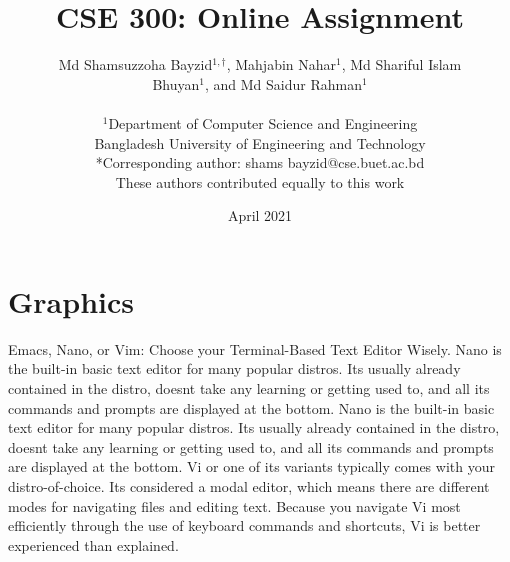 \documentclass[12pt, a4paper]{article} %
\title{CSE 300: Online Assignment}
\author{Md Shamsuzzoha Bayzid$^{1,\dagger}$, Mahjabin Nahar$^{1}$, Md Shariful Islam\\ Bhuyan$^{1}$, and Md Saidur Rahman$^{1}$ \\ \\
	$^1$Department of Computer Science and Engineering \\
	Bangladesh University of Engineering and Technology \\
	*Corresponding author: shams bayzid@cse.buet.ac.bd \\
	These authors contributed equally to this work
}
\date{April 2021}
\begin{document}
	\maketitle
	
	\section{Graphics}
Emacs, Nano, or Vim: Choose your Terminal-Based Text Editor Wisely. Nano
is the built-in basic text editor for many popular distros. Its usually already
contained in the distro, doesnt take any learning or getting used to, and all
its commands and prompts are displayed at the bottom. Nano is the built-in
basic text editor for many popular distros. Its usually already contained in the
distro, doesnt take any learning or getting used to, and all its commands and
prompts are displayed at the bottom. Vi or one of its variants typically comes
with your distro-of-choice. Its considered a modal editor, which means there
are different modes for navigating files and editing text. Because you navigate
Vi most efficiently through the use of keyboard commands and shortcuts, Vi is
better experienced than explained.
\end{document}
